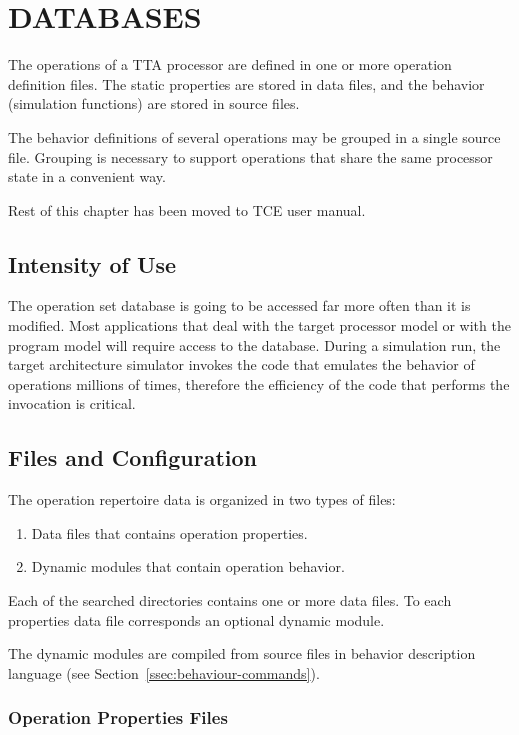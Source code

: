 \documentclass[twoside]{tce}
\begin{document}
\chapter{DATABASES}
\label{ch:database}

The operations of a TTA processor are defined in one or more operation
definition files.  The static properties are stored in data files, and the
behavior (simulation functions) are stored in source files.

The behavior definitions of several operations may be grouped in a single
source file.  Grouping is necessary to support operations that share the
same processor state in a convenient way.

Rest of this chapter has been moved to TCE user manual.


\section{Intensity of Use}

The operation set database is going to be accessed far more often than it is
modified.  Most applications that deal with the target processor model or
with the program model will require access to the database.  During a
simulation run, the target architecture simulator invokes the code that
emulates the behavior of operations millions of times, therefore the
efficiency of the code that performs the invocation is critical.

\section{Files and Configuration}

The operation repertoire data is organized in two types of files:
\begin{enumerate}
\item %
  Data files that contains operation properties.
\item %
  Dynamic modules that contain operation behavior.
\end{enumerate}

Each of the searched directories contains one or more data files.  To each
properties data file corresponds an optional dynamic module.

The dynamic modules are compiled from source files in behavior description
language (see Section~\ref{ssec:behaviour-commands}).

\subsection{Operation Properties Files}
\end{document}

